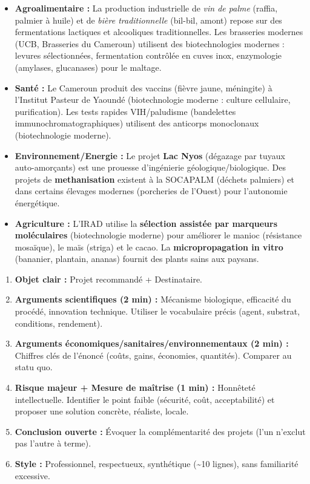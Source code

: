 \documentclass[11pt]{article}
\begin{document}
\begin{savaistu}
\begin{itemize}
\item \textbf{Agroalimentaire :} La production industrielle de \emph{vin de palme} (raffia, palmier à huile) et de \emph{bière traditionnelle} (bil-bil, amont) repose sur des fermentations lactiques et alcooliques traditionnelles. Les brasseries modernes (UCB, Brasseries du Cameroun) utilisent des biotechnologies modernes : levures sélectionnées, fermentation contrôlée en cuves inox, enzymologie (amylases, glucanases) pour le maltage.
\item \textbf{Santé :} Le Cameroun produit des vaccins (fièvre jaune, méningite) à l'Institut Pasteur de Yaoundé (biotechnologie moderne : culture cellulaire, purification). Les tests rapides VIH/paludisme (bandelettes immunochromatographiques) utilisent des anticorps monoclonaux (biotechnologie moderne).
\item \textbf{Environnement/Energie :} Le projet \textbf{Lac Nyos} (dégazage par tuyaux auto-amorçants) est une prouesse d'ingénierie géologique/biologique. Des projets de \textbf{methanisation} existent à la SOCAPALM (déchets palmiers) et dans certains élevages modernes (porcheries de l'Ouest) pour l'autonomie énergétique.
\item \textbf{Agriculture :} L'IRAD utilise la \textbf{sélection assistée par marqueurs moléculaires} (biotechnologie moderne) pour améliorer le manioc (résistance mosaïque), le maïs (striga) et le cacao. La \textbf{micropropagation in vitro} (bananier, plantain, ananas) fournit des plants sains aux paysans.
\end{itemize}
\end{savaistu}

\begin{methode}
\begin{enumerate}
\item \textbf{Objet clair :} Projet recommandé + Destinataire.
\item \textbf{Arguments scientifiques (2 min) :} Mécanisme biologique, efficacité du procédé, innovation technique. Utiliser le vocabulaire précis (agent, substrat, conditions, rendement).
\item \textbf{Arguments économiques/sanitaires/environnementaux (2 min) :} Chiffres clés de l'énoncé (coûts, gains, économies, quantités). Comparer au statu quo.
\item \textbf{Risque majeur + Mesure de maîtrise (1 min) :} Honnêteté intellectuelle. Identifier le point faible (sécurité, coût, acceptabilité) et proposer une solution concrète, réaliste, locale.
\item \textbf{Conclusion ouverte :} Évoquer la complémentarité des projets (l'un n'exclut pas l'autre à terme).
\item \textbf{Style :} Professionnel, respectueux, synthétique (\textasciitilde 10 lignes), sans familiarité excessive.
\end{enumerate}
\end{methode}
\end{document}
